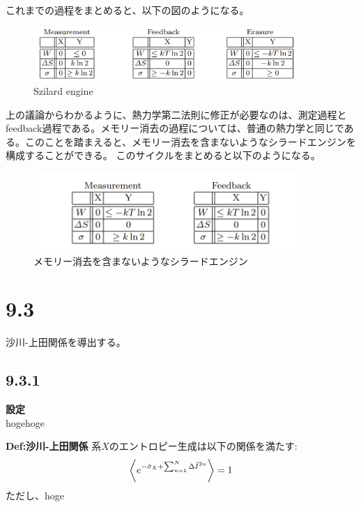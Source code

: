 \documentclass[a4paper,11pt]{jsarticle}
\numberwithin{equation}{section}
\begin{document}
これまでの過程をまとめると、以下の図のようになる。\\
\begin{figure}[H]
    \begin{center}
    \includegraphics[width=100mm]{mfe.png}
    \end{center}
    \caption{Szilard engine}
    \label{fig:mfe}
\end{figure}
上の議論からわかるように、熱力学第二法則に修正が必要なのは、測定過程とfeedback過程である。メモリー消去の過程については、普通の熱力学と同じである。このことを踏まえると、メモリー消去を含まないようなシラードエンジンを構成することができる。
このサイクルをまとめると以下のようになる。\\
\begin{figure}[H]
    \begin{center}
    \includegraphics[width=100mm]{cycle.png}
    \end{center}
    \caption{メモリー消去を含まないようなシラードエンジン}
    \label{fig:cycle}
\end{figure}

\section*{9.3}
沙川-上田関係を導出する。\\
\subsection*{9.3.1}
\textbf{設定}\\
hogehoge

\begin{itembox}[l]{\textbf{Def:沙川-上田関係}}
    系$X$のエントロピー生成は以下の関係を満たす:
    \begin{align}
        \ev{e^{-\hat{\sigma}_X+\sum_{n=1}^N\Delta \hat{I}^{2n} }} = 1
    \end{align}
    ただし、hoge
\end{itembox}
\end{document}
